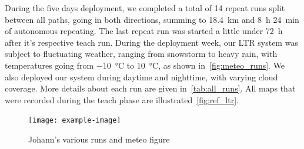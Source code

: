 During the five days deployment, we completed a total of 14 repeat runs split between all paths, going in both directions, summing to \SI{18.4}{km} and \SI{8}{h} \SI{24}{min} of autonomous repeating.
The last repeat run was started a little under \SI{72}{h} after it's respective teach run. 
During the deployment week, our \ac{LTR} system was subject to fluctuating weather, ranging from snowstorm to heavy rain, with temperatures going from \SI{-10}{\celsius} to \SI{10}{\celsius}, as shown in~\autoref{fig:meteo_runs}.
We also deployed our system during daytime and nighttime, with varying cloud coverage.
More details about each run are given in~\autoref{tab:all_runs}.
All maps that were recorded during the teach phase are illustrated~\autoref{fig:ref_ltr}.

\begin{figure} [htpb]
	\centering
	\texttt{[image: example-image]}
	\caption{Johann's various runs and meteo figure}
	\label{fig:meteo_runs}
\end{figure}

